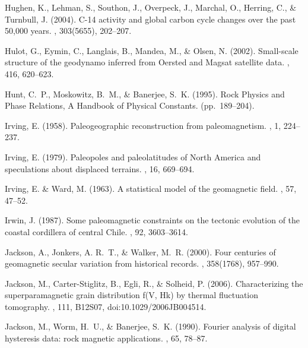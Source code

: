 \documentclass[11pt]{book}
\begin{document}
\begin{thebibliography}{}
Hughen, K., Lehman, S., Southon, J., Overpeck, J., Marchal, O., Herring, C., \&
  Turnbull, J. (2004).
\newblock C-14 activity and global carbon cycle changes over the past 50,000
  years.
, 303(5655), 202--207.

Hulot, G., Eymin, C., Langlais, B., Mandea, M., \& Olsen, N. (2002).
\newblock Small-scale structure of the geodynamo inferred from Oersted and
  Magsat satellite data.
, 416, 620--623.

Hunt, C.~P., Moskowitz, B.~M., \& Banerjee, S.~K. (1995).
\newblock Rock Physics and Phase Relations, A Handbook of Physical Constants.
\newblock (pp.\ 189--204).

Irving, E. (1958).
\newblock Paleogeographic reconstruction from paleomagnetism.
, 1, 224--237.

Irving, E. (1979).
\newblock Paleopoles and paleolatitudes of North America and speculations about
  displaced terrains.
, 16, 669--694.

Irving, E. \& Ward, M. (1963).
\newblock A statistical model of the geomagnetic field.
, 57, 47--52.

Irwin, J. (1987).
\newblock Some paleomagnetic constraints on the tectonic evolution of the
  coastal cordillera of central Chile.
, 92, 3603--3614.

Jackson, A., Jonkers, A. R.~T., \& Walker, M.~R. (2000).
\newblock Four centuries of geomagnetic secular variation from historical
  records.
, 358(1768), 957--990.

Jackson, M., Carter-Stiglitz, B., Egli, R., \& Solheid, P. (2006).
\newblock Characterizing the superparamagnetic grain distribution f(V, Hk) by
  thermal fluctuation tomography.
, 111, B12S07, doi:10.1029/2006JB004514.

Jackson, M., Worm, H.~U., \& Banerjee, S.~K. (1990).
\newblock Fourier analysis of digital hysteresis data: rock magnetic
  applications.
, 65, 78--87.


\end{thebibliography}
\end{document}

